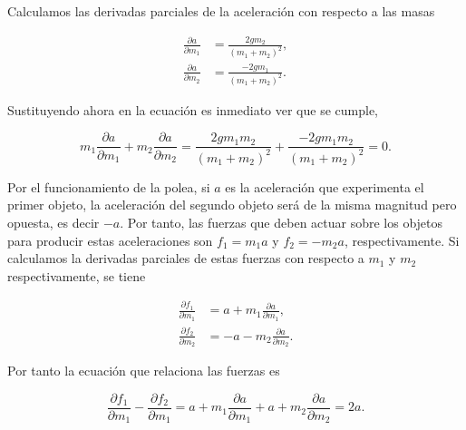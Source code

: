 \documentclass[
  spanish,
  a4paper,
]{scrreport}
\theoremstyle{definition}
\theoremstyle{remark}
\begin{document}
\begin{tcolorbox}[enhanced jigsaw, arc=.35mm, bottomrule=.15mm, bottomtitle=1mm, breakable, colback=white, colbacktitle=quarto-callout-tip-color!10!white, colframe=quarto-callout-tip-color-frame, coltitle=black, left=2mm, leftrule=.75mm, opacityback=0, opacitybacktitle=0.6, rightrule=.15mm, title=\textcolor{quarto-callout-tip-color}{\faLightbulb}\hspace{0.5em}{Solución}, titlerule=0mm, toprule=.15mm, toptitle=1mm]

Calculamos las derivadas parciales de la aceleración con respecto a las
masas

\begin{align*}
\frac{\partial a}{\partial m_1} 
&= \frac{2gm_2}{(m_1+m_2)^2}, \\
\frac{\partial a}{\partial m_2} 
&= \frac{-2gm_1}{(m_1+m_2)^2}.
\end{align*}

Sustituyendo ahora en la ecuación es inmediato ver que se cumple,

\[
m_1\frac{\partial a}{\partial m_1}+m_2\frac{\partial a}{\partial m_2}
= \frac{2gm_1m_2}{(m_1+m_2)^2} + \frac{-2gm_1m_2}{(m_1+m_2)^2}
=0.
\]

Por el funcionamiento de la polea, si \(a\) es la aceleración que
experimenta el primer objeto, la aceleración del segundo objeto será de
la misma magnitud pero opuesta, es decir \(-a\). Por tanto, las fuerzas
que deben actuar sobre los objetos para producir estas aceleraciones son
\(f_1 = m_1 a\) y \(f_2 = -m_2a\), respectivamente. Si calculamos la
derivadas parciales de estas fuerzas con respecto a \(m_1\) y \(m_2\)
respectivamente, se tiene

\begin{align*}
\frac{\partial f_1}{\partial m_1} 
&= a + m_1\frac{\partial a}{\partial m_1}, \\
\frac{\partial f_2}{\partial m_2} 
&= -a - m_2\frac{\partial a}{\partial m_2}.
\end{align*}

Por tanto la ecuación que relaciona las fuerzas es

\[
\frac{\partial f_1}{\partial m_1} - \frac{\partial f_2}{\partial m_1}
= a + m_1\frac{\partial a}{\partial m_1} + a + m_2\frac{\partial a}{\partial m_2}
= 2a.
\]

\end{tcolorbox}
\end{document}
